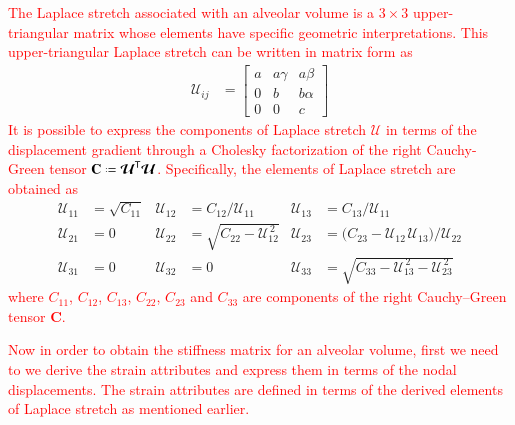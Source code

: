\textcolor{red}{The Laplace stretch associated with an alveolar volume is a $3\times3$ upper-triangular matrix whose elements have specific geometric interpretations. This upper-triangular Laplace stretch can be written in matrix form as \cite{FreedSrinivasa15}}
\begin{subequations}
    \label{LagrangianPhysicalStretch}
    \begin{align}
    \mathcal{U}_{ij} & = \begin{bmatrix}
    a & a \gamma & a \beta \\
    0 & b & b \alpha \\
    0 & 0 & c \end{bmatrix} 
    \end{align}
\end{subequations}
\textcolor{red}{It is possible to express the components of Laplace stretch $\boldsymbol{\mathcal{U}}$ in terms of the displacement gradient through a Cholesky factorization of the right Cauchy-Green tensor $\mathbf{C} \defeq \boldsymbol{\mathcal{U}}^{\mathsf{T}} \boldsymbol{\mathcal{U}}$. Specifically, the elements of Laplace stretch are obtained as} 
\begin{equation}
\begin{aligned}
\mathcal{U}_{11} & = \sqrt{C_{11}} & 
\mathcal{U}_{12} & = C_{12} / \mathcal{U}_{11} &
\mathcal{U}_{13} & = C_{13} / \mathcal{U}_{11} \\
\mathcal{U}_{21} & = 0 &
\mathcal{U}_{22} & = \sqrt{C_{22} - \mathcal{U}_{12}^{\,2}} &
\mathcal{U}_{23} & = \bigl( C_{23} - \mathcal{U}_{12\,}\mathcal{U}_{13} \bigr) / \mathcal{U}_{22} \\
\mathcal{U}_{31} & = 0 &
\mathcal{U}_{32} & = 0 & 
\mathcal{U}_{33} & = \sqrt{C_{33} - \mathcal{U}_{13}^{\,2} - \mathcal{U}_{23}^{\,2}}
\end{aligned}
\label{LagrangianLaplaceStretch}
\end{equation}
\textcolor{red}{where ${C_{11}}$, ${C_{12}}$, ${C_{13}}$, $C_{22}$, $C_{23}$ and ${C_{33}}$ are components of the right Cauchy--Green tensor $\mathbf{C}$.}

\textcolor{red}{Now in order to obtain the stiffness matrix for an alveolar volume, first we need to we derive the strain attributes and express them in terms of the nodal displacements. The strain attributes are defined in terms of the derived elements of Laplace stretch as mentioned earlier.}

